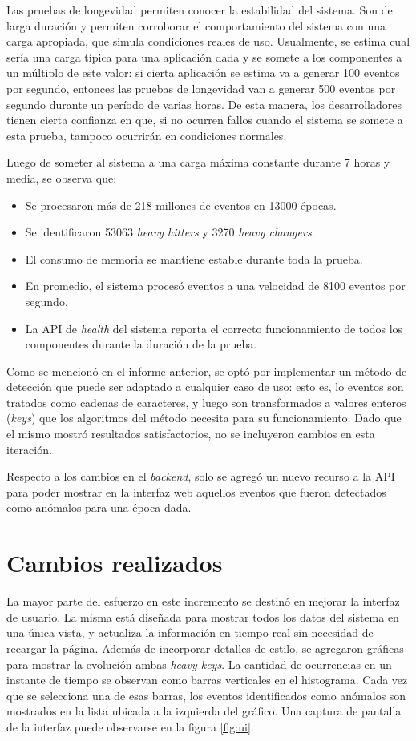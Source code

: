 \documentclass[a4paper,10pt, oneside]{article}
\begin{document}
Las pruebas de longevidad permiten conocer la estabilidad del sistema. Son de larga duración y permiten corroborar el comportamiento del sistema con una carga apropiada, que simula condiciones reales de uso. Usualmente, se estima cual sería una carga típica para una aplicación dada y se somete a los componentes a un múltiplo de este valor: si cierta aplicación se estima va a generar 100 eventos por segundo, entonces las pruebas de longevidad van a generar 500 eventos por segundo durante un período de varias horas. De esta manera, los desarrolladores tienen cierta confianza en que, si no ocurren fallos cuando el sistema se somete a esta prueba, tampoco ocurrirán en condiciones normales.

Luego de someter al sistema a una carga máxima constante durante 7 horas y media, se observa que:
\begin{itemize}
	\item Se procesaron más de 218 millones de eventos en 13000 épocas.
	\item Se identificaron 53063 \textit{heavy hitters} y 3270 \textit{heavy changers}.
	\item El consumo de memoria se mantiene estable durante toda la prueba.
	\item En promedio, el sistema procesó eventos a una velocidad de 8100 eventos por segundo.
	\item La API de \textit{health} del sistema reporta el correcto funcionamiento de todos los componentes durante la duración de la prueba.
\end{itemize}

Como se mencionó en el informe anterior, se optó por implementar un método de detección que puede ser adaptado a cualquier caso de uso: esto es, lo eventos son tratados como cadenas de caracteres, y luego son transformados a valores enteros (\textit{keys}) que los algoritmos del método necesita para su funcionamiento. Dado que el mismo mostró resultados satisfactorios, no se incluyeron cambios en esta iteración.

Respecto a los cambios en el \textit{backend}, solo se agregó un nuevo recurso a la API para poder mostrar en la interfaz web aquellos eventos que fueron detectados como anómalos para una época dada.

\section{Cambios realizados}
La mayor parte del esfuerzo en este incremento se destinó en mejorar la interfaz de usuario. La misma está diseñada para mostrar todos los datos del sistema en una única vista, y actualiza la información en tiempo real sin necesidad de recargar la página. Además de incorporar detalles de estilo, se agregaron gráficas para mostrar la evolución ambas \textit{heavy keys}. La cantidad de ocurrencias en un instante de tiempo se observan como barras verticales en el histograma. Cada vez que se selecciona una de esas barras, los eventos identificados como anómalos son mostrados en la lista ubicada a la izquierda del gráfico. Una captura de pantalla de la interfaz puede observarse en la figura \ref{fig:ui}.
\end{document}
